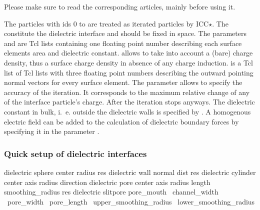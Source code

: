Please make sure to read the corresponding articles,
mainly\cite{espresso2, tyagi10a, kesselheim11a} before using it.

The particles with ids 0 to  are treated
as iterated particles by ICC$\star$.  The constitute the dielectric
interface and should be fixed in space. The parameters  and
 are Tcl lists containing one floating point number
describing each surface elements area and dielectric
constant.  allows to take into account a (bare) charge
density, thus a surface charge density in absence of any charge
induction.  is a Tcl list of Tcl lists with three
floating point numbers describing the outward pointing normal vectors
for every surface element.  The parameter 
allows to specify the accuracy of the iteration. It corresponds to the
maximum relative change of any of the interface particle's
charge. After  the iteration stops anyways. The
dielectric constant in bulk, i.~e. outside the dielectric walls is
specified by . A homogenous electric field can be added
to the calculation of dielectric boundary forces by specifying it in
the parameter .

\subsubsection{Quick setup of dielectric interfaces}

\begin{essyntax}
   dielectric sphere center    radius  res  
   dielectric wall normal    dist  res 
   dielectric cylinder  center    axis    radius  direction  
   dielectric pore center     axis    radius  length  smoothing\_radius  res 
   dielectric slitpore pore_mouth  \
             channel_width  \
             pore_width  \
             pore_length  \
             upper_smoothing_radius  \
             lower_smoothing_radius  

\end{essyntax}

